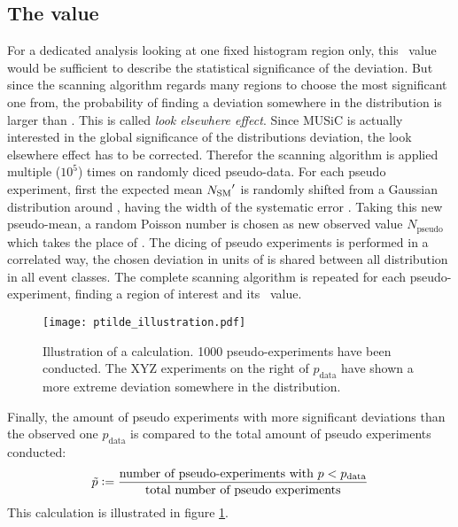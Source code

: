 \subsection{The \ptilde value}
\label{sec:music_ptilde}
For a dedicated analysis looking at one fixed histogram region only, this \p~value would be sufficient to describe the statistical significance of the deviation. But since the scanning algorithm regards many regions to choose the most significant one from, the probability of finding a deviation somewhere in the distribution is larger than \p. This is called \emph{look elsewhere effect}.
Since MUSiC is actually interested in the global significance of the distributions deviation, the look elsewhere effect has to be corrected.
Therefor the scanning algorithm is applied multiple ($10^5$) times on randomly diced pseudo-data. For each pseudo experiment, first the expected mean ${N_\mathrm{SM}}'$ is randomly shifted from a Gaussian distribution around \Nmc, having the width of the systematic error \sigmamc. Taking this new pseudo-mean, a random Poisson number is chosen as new observed value $N_\mathrm{pseudo}$ which takes the place of \Ndata. The dicing of pseudo experiments is performed in a correlated way, the chosen deviation in units of \sigmamc is shared between all distribution in all event classes. The complete scanning algorithm is repeated for each pseudo-experiment, finding a region of interest and its \p~value.
\begin{figure}[htb]
	\centering
	\texttt{[image: ptilde\_illustration.pdf]}
	\caption{Illustration of a \ptilde calculation. 1000 pseudo-experiments have been conducted. The XYZ experiments on the right of $p_\mathrm{data}$ have shown a more extreme deviation somewhere in the distribution.}
	\label{fig:ptilde_illustration}
\end{figure}
Finally, the amount of pseudo experiments with more significant deviations than the observed one $p_\mathrm{data}$ is compared to the total amount of pseudo experiments conducted:
\begin{equation}
	\tilde{p} \vcentcolon= \frac{\text{number of pseudo-experiments with } p < p_\mathrm{data}}{\text{total number of pseudo experiments}}
\end{equation}
This calculation is illustrated in figure \ref{fig:ptilde_illustration}.
